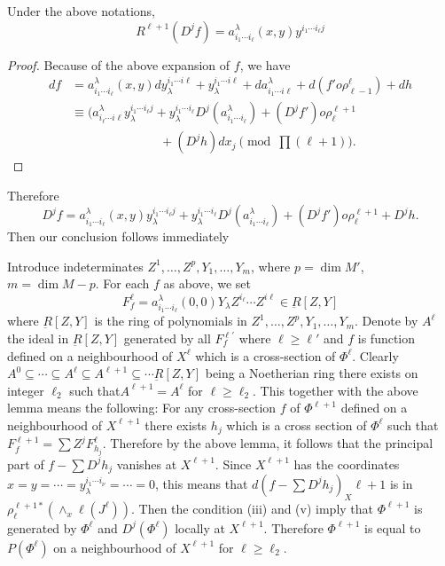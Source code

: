 \begin{lemma*}
  Under the above notations,
  $$
  R^{\ell+1} (D^j f) = a^\lambda_{i_1\cdots i_\ell} (x,y) y^{i_1\cdots i_\ell j}
  $$
\end{lemma*}   

\begin{proof}
  Because of the above expansion of $f$, we have
  \begin{align*}
    df&= a^\lambda_{i_1\cdots i_\ell}(x,y) dy^{i_1\cdots
      i\ell}_\lambda +y^{i_1 \cdots i\ell}_\lambda +
    da^\lambda_{i_1\cdots i\ell} + d(f'o \rho^\ell_{\ell-1})+dh\\ 
    &\equiv (a^\lambda_{i_\ell \cdots i\ell} y^{i_1\cdots i_\ell j}_\lambda
    + y_\lambda ^{i_1\cdots i_\ell} D^j (a^\lambda_{i_1\cdots i_\ell}) +
    (D^j f')o \rho^{\ell+1}_\ell\\ 
    & \hspace{3cm}+ (D^jh) dx_j \pmod {\prod (\ell+1)}. 
  \end{align*}
\end{proof}

Therefore
$$
D^jf = a^\lambda_{i_1\cdots i_\ell} (x,y)y^{i_1\cdots i_\ell j}_\lambda +
y^{i_1\cdots i_\ell}_\lambda D^j (a^\lambda_{i_1 \cdots i_\ell}) +
(D^jf') o \rho^{\ell+1}_\ell +D^j h. 
$$
Then our conclusion follows immediately

Introduce indeterminates $Z^1 , \ldots , Z^p, Y_1,\ldots , Y_m$, where
$p=\dim M'$, $m=\dim M-p$. For each $f$ as above, we set 
$$
F^\ell_f = a^\lambda_{i_1\cdots i_\ell} (0,0) Y_\lambda Z^{i_\ell} \cdots
Z^{i\ell} \in \underbar{R} [Z,Y] 
$$
where $\underbar{R}[Z,Y]$ is the ring of polynomials in $Z^1 , \ldots
, Z^p , Y_1,\ldots ,Y_m$. Denote by $A^\ell$ the ideal in
$\underbar{R}[Z,Y]$ generated by all $F^{\ell'}_f$ where $\ell \geq
\ell'$ and $f$ is function defined on a neighbourhood of $X^\ell$
which is a cross-section of $\Phi^\ell$. Clearly $A^0 \subseteq \cdots
\subseteq A^\ell \subseteq A^{\ell+1} \subseteq \cdots
\underbar{R}[Z,Y]$ being a Noetherian ring there exists on integer
$\ell_2$ such that\pageoriginale $A^{\ell+1} = A^\ell$ for $\ell\geq \ell_2$. This
together with the above lemma means the following: For any
cross-section $f$ of $\Phi^{\ell+1}$ defined on a neighbourhood of
$X^{\ell+1}$ there exists $h_j$ which is a cross section of
$\Phi^\ell$ such that $F^{\ell+1}_f = \sum Z^j
F^{\ell}_{h_j}$. Therefore by the above lemma, it follows that the
principal part of $f-\sum D^j h_j$ vanishes at $X^{\ell+1}$. Since
$X^{\ell+1}$ has the coordinates $x=y= \cdots = y^{i_1\cdots
  i_\nu}_\lambda = \cdots =0$, this means that $d(f-\sum D^j h_j)_X
\ell+1$ is in $\rho^{\ell+1*}_{\ell} (\wedge _x \ell (J^\ell))$. Then
the condition (iii) and (v) imply that $\Phi^{\ell+1}$ is
generated by $\Phi^\ell$ and $D^j (\Phi^\ell)$ locally at
$X^{\ell+1}$. Therefore $\Phi^{\ell+1}$ is equal to $P(\Phi^\ell)$ on
a neighbourhood of $X^{\ell+1}$ for $\ell \ge \ell_2$. 

